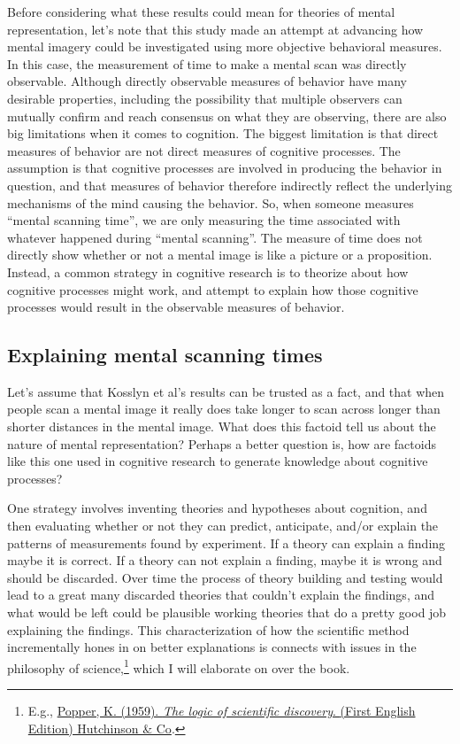 \documentclass[
  oneside,
  12pt]{crumpbook}
\begin{document}
Before considering what these results could mean for theories of mental representation, let's note that this study made an attempt at advancing how mental imagery could be investigated using more objective behavioral measures. In this case, the measurement of time to make a mental scan was directly observable. Although directly observable measures of behavior have many desirable properties, including the possibility that multiple observers can mutually confirm and reach consensus on what they are observing, there are also big limitations when it comes to cognition. The biggest limitation is that direct measures of behavior are not direct measures of cognitive processes. The assumption is that cognitive processes are involved in producing the behavior in question, and that measures of behavior therefore indirectly reflect the underlying mechanisms of the mind causing the behavior. So, when someone measures ``mental scanning time'', we are only measuring the time associated with whatever happened during ``mental scanning''. The measure of time does not directly show whether or not a mental image is like a picture or a proposition. Instead, a common strategy in cognitive research is to theorize about how cognitive processes might work, and attempt to explain how those cognitive processes would result in the observable measures of behavior.

\hypertarget{explaining-mental-scanning-times}{%
\subsection{Explaining mental scanning times}\label{explaining-mental-scanning-times}}

Let's assume that Kosslyn et al's results can be trusted as a fact, and that when people scan a mental image it really does take longer to scan across longer than shorter distances in the mental image. What does this factoid tell us about the nature of mental representation? Perhaps a better question is, how are factoids like this one used in cognitive research to generate knowledge about cognitive processes?

One strategy involves inventing theories and hypotheses about cognition, and then evaluating whether or not they can predict, anticipate, and/or explain the patterns of measurements found by experiment. If a theory can explain a finding maybe it is correct. If a theory can not explain a finding, maybe it is wrong and should be discarded. Over time the process of theory building and testing would lead to a great many discarded theories that couldn't explain the findings, and what would be left could be plausible working theories that do a pretty good job explaining the findings. This characterization of how the scientific method incrementally hones in on better explanations is connects with issues in the philosophy of science,\footnote{E.g., \protect\hyperlink{ref-popperLogicScientificDiscovery1959}{Popper, K. (1959). \emph{The logic of scientific discovery}. {(First English Edition) Hutchinson \& Co}}.} which I will elaborate on over the book.
\end{document}
